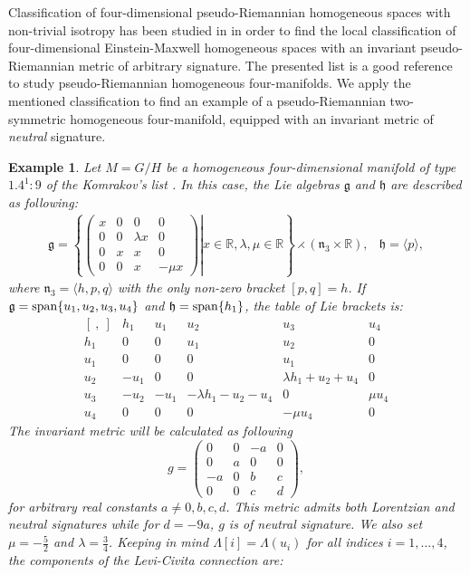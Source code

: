 \documentclass[11pt,oneside,leqno]{amsart}
\theoremstyle{plain}
\newtheorem{ex}[theorem]{Example}
\begin{document}
Classification of four-dimensional pseudo-Riemannian homogeneous spaces with non-trivial isotropy has been studied in \cite{K}  in order to find the local classification of four-dimensional Einstein-Maxwell homogeneous spaces with an invariant pseudo-Riemannian metric of arbitrary signature. The presented list is a good reference to study pseudo-Riemannian homogeneous four-manifolds. We apply the mentioned classification to find an example of a pseudo-Riemannian two-symmetric homogeneous four-manifold, equipped with an invariant metric of {\em neutral} signature.
\begin{ex}
Let $M=G/H$ be a homogeneous four-dimensional manifold of type $1.4^1:9$ of the Komrakov's list \cite{K}. In this case, the Lie algebras ${{\mathfrak{g}}}$ and ${{\mathfrak{h}}}$ are described as following:
$$
\begin{array}{ll}
{{\mathfrak{g}}}=\left\{\left.\left(\begin{array}{cccc}x&0&0&0\\0&0&\lambda x&0\\0&x&x&0\\0&0&x&-\mu x\end{array}\right)\right|x\in{{\mathbb R}},\lambda,\mu\in{{\mathbb R}}\right\}\rightthreetimes(\mathfrak n_3\times {{\mathbb R}}),& {{\mathfrak{h}}}=\langle p\rangle,
\end{array}
$$
where $\mathfrak n_3=\langle h,p,q\rangle$ with the only non-zero bracket $[p,q]=h$. If ${{\mathfrak{g}}}={\rm span}\{u_1,u_2,u_3,u_4\}$ and ${{\mathfrak{h}}}={\rm span}\{h_1\}$, the table of Lie brackets is:
$$
\begin{array}{c|ccccc}
[\ ,\ ]&h_1&u_1&u_2&u_3&u_4\\
\hline
h_1&0&0&u_1&u_2&0\\
u_1&0&0&0&u_1&0\\
u_2&-u_1&0&0&\lambda h_1+u_2+u_4&0\\
u_3&-u_2&-u_1&-\lambda h_1-u_2-u_4&0&\mu u_4\\
u_4&0&0&0&-\mu u_4&0
\end{array}
$$
The invariant metric will be calculated as following
$$
g= \left( \begin {array}{cccc} 0&0&-a&0\\ 0&a&0&0
\\ -a&0&b&c\\0&0&c&d
\end {array} \right),
$$
for arbitrary real constants $a\neq 0,b,c,d$. This metric admits both Lorentzian and neutral signatures while for $d=-9a$, $g$ is of neutral signature. We also set $\mu=-\frac 52$ and $\lambda=\frac 34$. Keeping in mind $\Lambda[i]=\Lambda(u_i)$ for all indices $i=1,\dots,4$, the components of the Levi-Civita connection are:

\end{ex}
\end{document}
